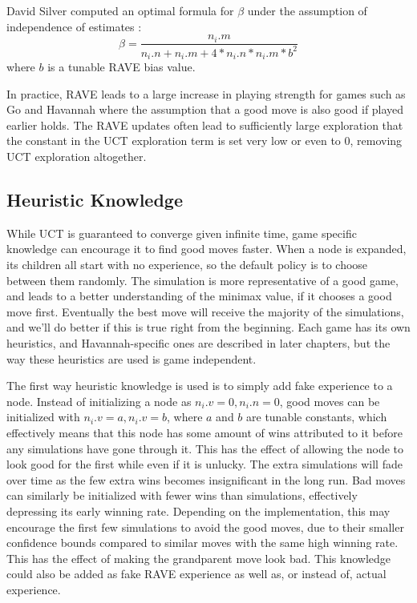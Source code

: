 David Silver computed an optimal formula for $\beta$ under the assumption of independence of estimates \cite{silver2009reinforcement}:
\begin{equation}\label{eqn:rave4} \beta = \frac{n_i.m}{n_i.n+n_i.m+4*n_i.n*n_i.m*b^2} \end{equation}
where $b$ is a tunable RAVE bias value.

In practice, RAVE leads to a large increase in playing strength for games such as Go and Havannah where the assumption that a good move is also good if played earlier holds. The RAVE updates often lead to sufficiently large exploration that the constant in the UCT exploration term is set very low or even to 0, removing UCT exploration altogether.

\subsection{Heuristic Knowledge}\label{sec:heuristicknowledge}

While UCT is guaranteed to converge given infinite time, game specific knowledge can encourage it to find good moves faster. When a node is expanded, its children all start with no experience, so the default policy is to choose between them randomly. The simulation is more representative of a good game, and leads to a better understanding of the minimax value, if it chooses a good move first. Eventually the best move will receive the majority of the simulations, and we'll do better if this is true right from the beginning. Each game has its own heuristics, and Havannah-specific ones are described in later chapters, but the way these heuristics are used is game independent.

The first way heuristic knowledge is used is to simply add fake experience to a node. Instead of initializing a node as $n_i.v = 0, n_i.n = 0$, good moves can be initialized with $n_i.v = a, n_i.v = b$, where $a$ and $b$ are tunable constants, which effectively means that this node has some amount of wins attributed to it before any simulations have gone through it. This has the effect of allowing the node to look good for the first while even if it is unlucky. The extra simulations will fade over time as the few extra wins becomes insignificant in the long run. Bad moves can similarly be initialized with fewer wins than simulations, effectively depressing its early winning rate. Depending on the implementation, this may encourage the first few simulations to avoid the good moves, due to their smaller confidence bounds compared to similar moves with the same high winning rate. This has the effect of making the grandparent move look bad. This knowledge could also be added as fake RAVE experience as well as, or instead of, actual experience.

